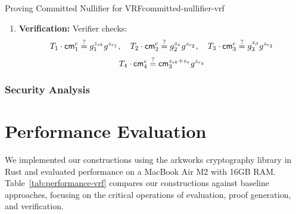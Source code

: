 \begin{protocol}{Proving Committed Nullifier for VRF}{committed-nullifier-vrf}
\begin{enumerate}
    \item \textbf{Verification:} Verifier checks:
       \[
       T_1 \cdot \mathsf{cm}_1^c \stackrel{?}{=} g_1^{z_{sk}} g^{z_{r_1}}, \quad T_2 \cdot \mathsf{cm}_2^c \stackrel{?}{=} g_2^{z_x} g^{z_{r_2}}, \quad T_3 \cdot \mathsf{cm}_3^c \stackrel{?}{=} g_3^{z_{\beta}} g^{z_{r_3}}
       \]
       \[
       T_4 \cdot \mathsf{cm}_4^c \stackrel{?}{=} \mathsf{cm}_3^{z_{sk} + z_x} g^{z_{r_4}}
       \]
\end{enumerate}
\end{protocol}


\subsubsection{Security Analysis}












\section{Performance Evaluation}\label{sec:performance-vrf}

We implemented our constructions \cite{polgar_anonymous_2025} using the arkworks cryptography library \cite{arkworks_contributors_arkworks_2022} in Rust and evaluated performance on a MacBook Air M2 with 16GB RAM. Table~\ref{tab:performance-vrf} compares our constructions against baseline approaches, focusing on the critical operations of evaluation, proof generation, and verification.

